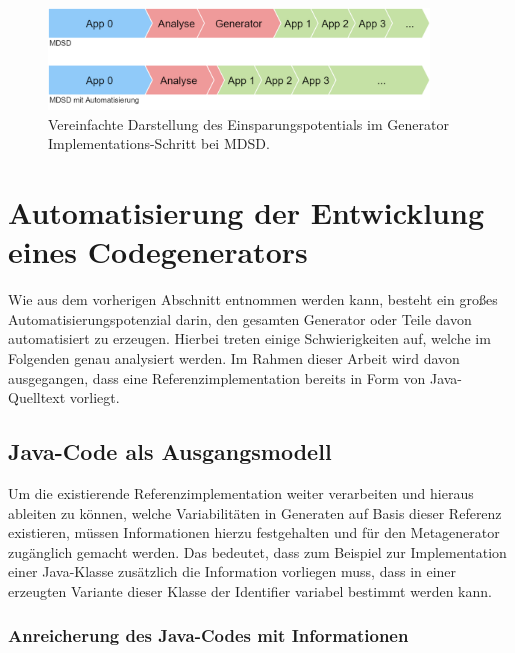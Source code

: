 \documentclass[12pt,oneside,a4paper,parskip]{scrbook}
\begin{document}
\begin{figure}[htbp]
\centering
\includegraphics[width=0.9\textwidth]{bilder/vergleich_2}
\caption{Vereinfachte Darstellung des Einsparungspotentials im Generator Implementations-Schritt bei MDSD.}
\label{fig:vgl2}
\end{figure}


\section{Automatisierung der Entwicklung eines Codegenerators}

Wie aus dem vorherigen Abschnitt entnommen werden kann, besteht ein großes Automatisierungspotenzial darin, den gesamten Generator oder Teile davon automatisiert zu erzeugen. Hierbei treten einige Schwierigkeiten auf, welche im Folgenden genau analysiert werden. Im Rahmen dieser Arbeit wird davon ausgegangen, dass eine Referenzimplementation bereits in Form von Java-Quelltext vorliegt.

\subsection{Java-Code als Ausgangsmodell}

Um die existierende Referenzimplementation weiter verarbeiten und hieraus ableiten zu können, welche Variabilitäten in Generaten auf Basis dieser Referenz existieren, müssen Informationen hierzu festgehalten und für den Metagenerator zugänglich gemacht werden. Das bedeutet, dass zum Beispiel zur Implementation einer Java-Klasse zusätzlich die Information vorliegen muss, dass in einer erzeugten Variante dieser Klasse der Identifier variabel bestimmt werden kann.

\subsubsection{Anreicherung des Java-Codes mit Informationen}
\end{document}
